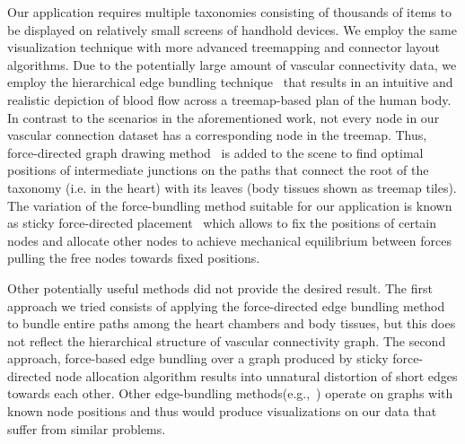 Our application requires multiple taxonomies consisting of thousands of items to be displayed on relatively small screens of handhold devices. We employ the same visualization technique with more advanced treemapping and connector layout algorithms. Due to the potentially large amount of vascular connectivity data, we employ the hierarchical edge bundling technique~\cite{Hol06} that results in an intuitive and realistic depiction of blood flow across a treemap-based plan of the human body. In contrast to the scenarios in the aforementioned work, not every node in our vascular connection dataset has a corresponding node in the treemap. Thus, force-directed graph drawing method~\cite{BET+99} is added to the scene to find optimal positions of intermediate junctions on the paths that connect the root of the taxonomy (i.e. in the heart) with its leaves (body tissues shown as treemap tiles). The variation of the force-bundling method suitable for our application is known as sticky force-directed placement~\cite{FR91} which allows to fix the positions of certain nodes and allocate other nodes to achieve mechanical equilibrium between forces pulling the free nodes towards fixed positions.

Other potentially useful methods did not provide the desired result. The first approach we tried consists of applying the force-directed edge bundling method~\cite{HW09} to bundle entire paths among the heart chambers and body tissues, but this does not reflect the hierarchical structure of vascular connectivity graph. The second approach, force-based edge bundling over a graph produced by sticky force-directed node allocation algorithm results into unnatural distortion of short edges towards each other. Other edge-bundling methods(e.g.,~\cite{GHN+11,HET12,SHH11}) operate on graphs with known node positions and thus would produce visualizations on our data that suffer from similar problems.
